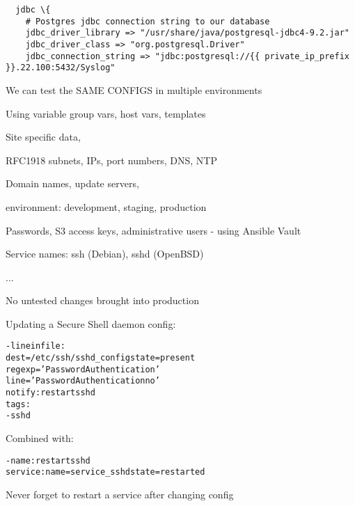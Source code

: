 \documentclass[17pt,Screen16to9,footrule]{foils}
\begin{document}

{\small\begin{verbatim}
  jdbc \{
    # Postgres jdbc connection string to our database
    jdbc_driver_library => "/usr/share/java/postgresql-jdbc4-9.2.jar"
    jdbc_driver_class => "org.postgresql.Driver"
    jdbc_connection_string => "jdbc:postgresql://{{ private_ip_prefix }}.22.100:5432/Syslog"
\end{verbatim}}


\begin{list1}
\item We can test the SAME CONFIGS in multiple environments
\item Using variable group vars, host vars, templates
\begin{list2}
\item Site specific data,
\item RFC1918 subnets, IPs, port numbers, DNS, NTP
\item Domain names, update servers,
\item environment: development, staging, production
\item Passwords, S3 access keys, administrative users - using Ansible Vault
\item Service names: ssh (Debian), sshd (OpenBSD)
\item ...
\end{list2}
\item No untested changes brought into production
\end{list1}



Updating a Secure Shell daemon config:
\begin{alltt}\small
- lineinfile:
    dest=/etc/ssh/sshd_config state=present
    regexp='PasswordAuthentication'
    line='PasswordAuthentication no'
  notify: restart sshd
  tags:
    - sshd
\end{alltt}

Combined with:
\begin{alltt}
- name: restart sshd
    service: name={{ service_sshd }} state=restarted
\end{alltt}

\vskip 1cm
\centerline{Never forget to restart a service after changing config}


\end{document}
